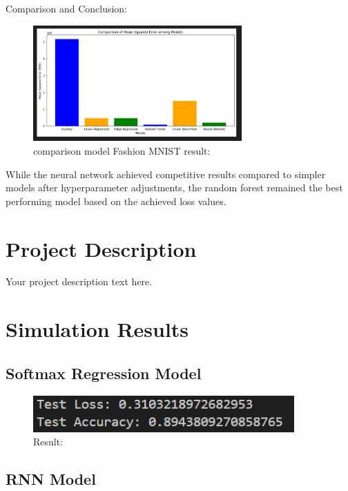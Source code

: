 \documentclass{article}
\begin{document}
Comparison and Conclusion:
\begin{figure}[H]
    \caption{comparison model Fashion MNIST result:}
    \centering
    \includegraphics[width=8cm]{imgFolder/comparisonFlight.png}
\end{figure}
While the neural network achieved competitive results compared to simpler models after hyperparameter adjustments, the random forest remained the best performing model based on the achieved loss values.

\section{Project Description}
Your project description text here.


\section{Simulation Results}

\subsection{Softmax Regression Model}

\begin{figure}[H]
    \caption{Result:}
    \centering
    \includegraphics[width=10cm]{imgFolder/softMaxResult.png}
\end{figure}

\subsection{RNN Model}

\end{document}
